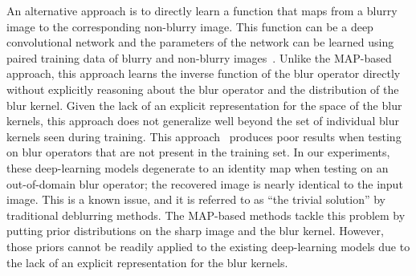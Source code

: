 \documentclass[final]{cvpr}
\newcommand{\Tref}[1]{Table~\ref{#1}}
\begin{document}
An alternative approach is to directly learn a function that maps from a blurry image to the corresponding non-blurry image. This function can be a deep convolutional network and the parameters of the network can be learned using paired training data of blurry and non-blurry images~\cite{nah2017deep,tao2018scale,kupyn2018deblurgan,kupyn2019deblurgan}. Unlike the MAP-based approach, this approach learns the inverse function of the blur operator directly without explicitly reasoning about the blur operator and the distribution of the blur kernel. Given the lack of an explicit representation for the space of the blur kernels, this approach does not generalize well beyond the set of individual blur kernels seen during training. This approach~\cite{nah2017deep,tao2018scale,kupyn2018deblurgan,kupyn2019deblurgan} produces poor results when testing on blur operators that are not present in the training set. In our experiments, these deep-learning models degenerate to an identity map when testing on an out-of-domain blur operator; the recovered image is nearly identical to the input image. This is a known issue, and it is referred to as ``the trivial solution'' by traditional deblurring methods.  The MAP-based methods tackle this problem by putting prior distributions on the sharp image and the blur kernel. However, those priors cannot be readily applied to the existing deep-learning models due to the lack of an explicit representation for the blur kernels. 
\end{document}
